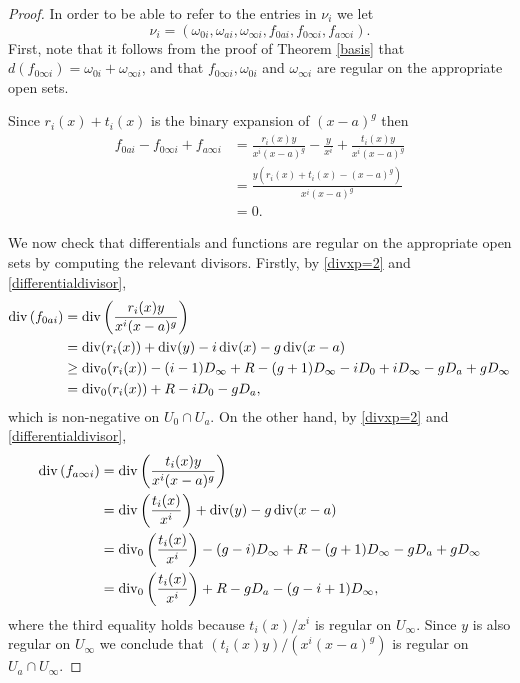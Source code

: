     \begin{proof}
    In order to be able to refer to the entries in $\nu_i$ we let
        \[
        \nu_i = \left( \omega_{0 i}, \omega_{a i}, \omega_{\infty i}, f_{0 a i}, f_{0 \infty i}, f_{a \infty i} \right).
        \]
    First, note that it follows from the proof of Theorem \ref{basis} that $d(f_{0 \infty i}) = \omega_{0 i} + \omega_{\infty i}$, and that $f_{0 \infty i}, \omega_{0 i}$ and $\omega_{\infty i}$ are regular on the appropriate open sets.
    
    Since $r_i(x)+t_i(x)$ is the binary expansion of $(x-a)^g$ then
        \begin{align*}
        f_{0 a i} - f_{0 \infty i}+ f_{a \infty i} & = \frac{r_i(x)y}{x^i(x-a)^g} - \frac{y}{x^i} + \frac{t_i(x)y}{x^i(x-a)^g} \\
        & = \frac{y(r_i(x) + t_i(x) - (x-a)^g)}{x^i(x-a)^g} \\
        & = 0.
        \end{align*}
    
    
    
    We now check that differentials and functions are regular on the appropriate open sets by computing the relevant divisors.
    Firstly, by \eqref{divxp=2} and \eqref{differentialdivisor},
        \begin{align*}
        \operatorname{div} \left( f_{0 a i} \right) & = \operatorname{div} \left( \frac{r_i(x)y}{x^i(x-a)^g} \right) \\
        &  = \operatorname{div}(r_i(x)) + \operatorname{div}(y) - i\operatorname{div}(x) - g\operatorname{div}(x-a) \\
        & \geq \operatorname{div}_0(r_i(x)) - (i-1)D_\infty +R - (g+1)D_\infty - iD_0 + iD_\infty - gD_a + gD_\infty \\
        & = \operatorname{div}_0(r_i(x)) +R -iD_0 - gD_a,
        \end{align*}
    which is non-negative on $U_0 \cap U_a$.
    On the other hand, by \eqref{divxp=2} and \eqref{differentialdivisor},
        \begin{align*}
        \operatorname{div} \left( f_{a \infty i} \right) & = \operatorname{div} \left( \frac{t_i(x)y}{x^i(x-a)^g} \right) \\
        & = \operatorname{div}\left(\frac{t_i(x)}{x^i}\right) + \operatorname{div}(y) - g\operatorname{div}(x-a) \\
        & = \operatorname{div}_0 \left( \frac{t_i(x)}{x^i} \right) - (g-i)D_\infty +R - (g+1)D_\infty - gD_a + gD_\infty\\
        & = \operatorname{div}_0 \left( \frac{t_i(x)}{x^i} \right) +R - gD_a -(g-i+1)D_\infty,
        \end{align*}
    where the third equality holds because $t_i(x)/x^i$ is regular on $U_\infty$.
    Since $y$ is also regular on $U_\infty$  we conclude that $({t_i(x)y})/({x^i(x-a)^g})$ is regular on $U_a \cap U_\infty$.
    

\end{proof}
